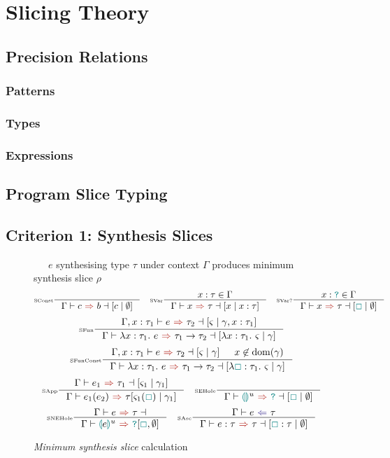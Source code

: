 \chapter{Slicing Theory}
\section{Precision Relations}
\subsection{Patterns}
\subsection{Types}
\subsection{Expressions}

\section{Program Slice Typing}

\section{Criterion 1: Synthesis Slices}
\begin{figure}[H]
\small
{}\ \ \ $e$ synthesising type $\tau$ under context $\Gamma$ produces minimum synthesis slice $\rho$
\tiny
\[\inference[\tiny SConst]{}{\synthesisslice{c}{b}{[c\mid \emptyset]}} \quad
\inference[\tiny SVar]{x : \tau \in \Gamma}{\synthesisslice{x}{\tau}{[x\mid x:\tau]}} \quad
\inference[\tiny SVar?]{x : \dyn \in \Gamma}{\synthesisslice{x}{\tau}{[\gap\mid \emptyset]}}\]
\[\inference[\tiny SFun]{\synthesisslice[\Gamma,x:\tau_1]{e}{\tau_2}{[\varsigma \mid \gamma, x : \tau_1]} }{\synthesisslice{\lambda x:\tau_1.\ e}{\tau_1 \to \tau_2}{[\lambda x : \tau_1.\ \varsigma \mid \gamma]}}\]
\[\inference[\tiny SFunConst]{\synthesisslice[\Gamma,x:\tau_1]{e}{\tau_2}{[\varsigma \mid \gamma]} & x \not \in \mathrm{dom}(\gamma)}{\synthesisslice{\lambda x:\tau_1.\ e}{\tau_1 \to \tau_2}{[\lambda \gap : \tau_1.\ \varsigma \mid \gamma]}}\]
\[\inference[\tiny SApp]{\synthesisslice{e_1}{\tau_1}{[\varsigma_1 \mid \gamma_1]}}{\synthesis{e_1(e_2)}{\tau}{[\varsigma_1(\gap) \mid \gamma_1]}} \quad 
\inference[\tiny SEHole]{}{\synthesisslice{\hole^u}{\dyn}{[\gap \mid \emptyset]}}\]
\[\inference[\tiny SNEHole]{\synthesisslice{e}{\tau}}{\synthesis{\hole[e]^u}{\dyn}{[\gap, \emptyset]}}\quad 
\inference[\tiny SAsc]{\analysis{e}{\tau}}{\synthesisslice{e : \tau}{\tau}{[\gap : \tau \mid \emptyset]}}\]

\caption{\textit{Minimum synthesis slice} calculation}
\label{fig:SynthesisSlices}
\end{figure} 

